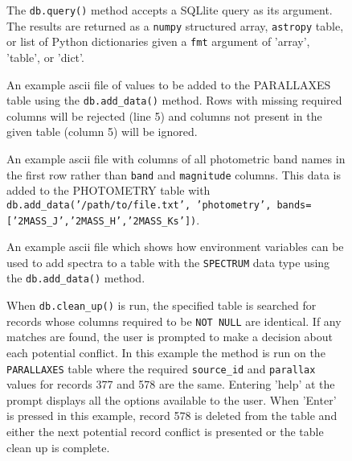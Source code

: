 \documentclass[iop,revtex4,natbib209]{emulateapj}
\begin{document}
\begin{figure}
\begin{center}
\caption{\label{fig:query}The \texttt{db.query()} method accepts a SQLlite query as its argument. The results are returned as a \texttt{numpy} structured array, \texttt{astropy} table, or list of Python dictionaries given a \texttt{fmt} argument of 'array', 'table', or 'dict'.}
\end{center}
\end{figure}

\begin{figure}
\begin{center}
\caption{\label{fig:upload}An example ascii file of values to be added to the PARALLAXES table using the \texttt{db.add\_data()} method. Rows with missing required columns will be rejected (line 5) and columns not present in the given table (column 5) will be ignored.}
\end{center}
\end{figure}

\begin{figure}
\begin{center}
\caption{\label{fig:multiband}An example ascii file with columns of all photometric band names in the first row rather than \texttt{band} and \texttt{magnitude} columns. This data is added to the PHOTOMETRY table with \texttt{db.add\_data('/path/to/file.txt', 'photometry', bands=['2MASS\_J','2MASS\_H','2MASS\_Ks'])}.}
\end{center}
\end{figure}

\begin{figure}
\begin{center}
\caption{\label{fig:add_spectra}An example ascii file which shows how environment variables can be used to add spectra to a table with the \texttt{SPECTRUM} data type using the \texttt{db.add\_data()} method.}
\end{center}
\end{figure}

\begin{figure}
\begin{center}
\caption{\label{fig:conflict}When \texttt{db.clean\_up()} is run, the specified table is searched for records whose columns required to be \texttt{NOT NULL} are identical. If any matches are found, the user is prompted to make a decision about each potential conflict. In this example the method is run on the \texttt{PARALLAXES} table where the required \texttt{source\_id} and \texttt{parallax} values for records 377 and 578 are the same. Entering 'help' at the prompt displays all the options available to the user. When 'Enter' is pressed in this example, record 578 is deleted from the table and either the next potential record conflict is presented or the table clean up is complete.}
\end{center}
\end{figure}
\end{document}
